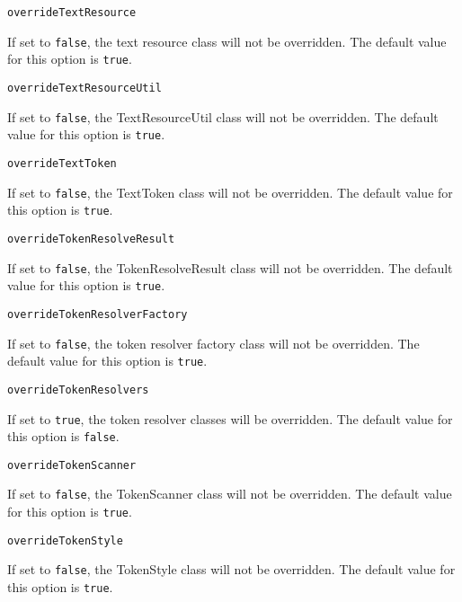 \noindent\texttt{overrideTextResource}
\begin{myindentpar}{1cm}
If set to \texttt{false}, the text resource class will not be overridden. The default value for this option is \texttt{true}.
\end{myindentpar}

\noindent\texttt{overrideTextResourceUtil}
\begin{myindentpar}{1cm}
If set to \texttt{false}, the TextResourceUtil class will not be overridden. The default value for this option is \texttt{true}.
\end{myindentpar}

\noindent\texttt{overrideTextToken}
\begin{myindentpar}{1cm}
If set to \texttt{false}, the TextToken class will not be overridden. The default value for this option is \texttt{true}.
\end{myindentpar}

\noindent\texttt{overrideTokenResolveResult}
\begin{myindentpar}{1cm}
If set to \texttt{false}, the TokenResolveResult class will not be overridden. The default value for this option is \texttt{true}.
\end{myindentpar}

\noindent\texttt{overrideTokenResolverFactory}
\begin{myindentpar}{1cm}
If set to \texttt{false}, the token resolver factory class will not be overridden. The default value for this option is \texttt{true}.
\end{myindentpar}

\noindent\texttt{overrideTokenResolvers}
\begin{myindentpar}{1cm}
If set to \texttt{true}, the token resolver classes will be overridden. The default value for this option is \texttt{false}.
\end{myindentpar}

\noindent\texttt{overrideTokenScanner}
\begin{myindentpar}{1cm}
If set to \texttt{false}, the TokenScanner class will not be overridden. The default value for this option is \texttt{true}.
\end{myindentpar}

\noindent\texttt{overrideTokenStyle}
\begin{myindentpar}{1cm}
If set to \texttt{false}, the TokenStyle class will not be overridden. The default value for this option is \texttt{true}.
\end{myindentpar}

